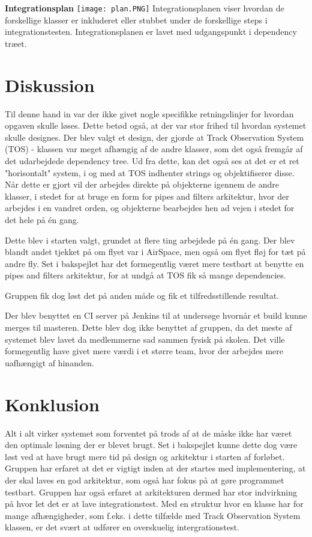 \textbf{Integrationsplan} \newline
\texttt{[image: plan.PNG]} \newline
Integrationsplanen viser hvordan de forskellige klasser er inkluderet eller stubbet under de forskellige steps i integrationstesten. Integrationsplanen er lavet med udgangspunkt i dependency træet.

\section{Diskussion}
Til denne hand in var der ikke givet nogle specifikke retningslinjer for hvordan opgaven skulle løses. Dette betød også, at der var stor frihed til hvordan systemet skulle designes. \tabularnewline
Der blev valgt et design, der gjorde at Track Observation System (TOS) - klassen var meget afhængig af de andre klasser, som det også fremgår af det udarbejdede dependency tree. 
Ud fra dette, kan det også ses at det er et ret "horisontalt" system, i og med at TOS indhenter strings og objektifiserer disse. 
Når dette er gjort vil der arbejdes direkte på objekterne igennem de andre klasser, i stedet for at bruge en form for pipes and filters arkitektur, hvor der arbejdes i en vandret orden, og objekterne bearbejdes hen ad vejen i stedet for det hele på én gang. 

Dette blev i starten valgt, grundet at flere ting arbejdede på én gang. Der blev blandt andet tjekket på om flyet var i AirSpace, men også om flyet fløj for tæt på andre fly. \tabularnewline
Set i bakspejlet har det formegentlig været mere testbart at benytte en pipes and filters arkitektur, for at undgå at TOS fik så mange dependencies.

Gruppen fik dog løst det på anden måde og fik et tilfredsstillende resultat.


Der blev benyttet en CI server på Jenkins til at undersøge hvornår et build kunne merges til masteren. \tabularnewline
Dette blev dog ikke benyttet af gruppen, da det meste af systemet blev lavet da medlemmerne sad sammen fysisk på skolen.\tabularnewline
Det ville formegentlig have givet mere værdi i et større team, hvor der arbejdes mere uafhængigt af hinanden. \newline
\pagebreak
\section{Konklusion}
Alt i alt virker systemet som forventet på trods af at de måske ikke har været den optimale løsning der er blevet brugt. \tabularnewline
Set i bakspejlet kunne dette dog være løst ved at have brugt mere tid på design og arkitektur i starten af forløbet.  \tabularnewline
Gruppen har erfaret at det er vigtigt inden at der startes med implementering, at der skal laves en god arkitektur,
som også har fokus på at gøre programmet testbart. \tabularnewline
Gruppen har også erfaret at arkitekturen dermed har stor indvirkning på hvor let det er at lave integrationstest. Med en struktur hvor 
en klasse har for mange afhængigheder, som f.eks. i dette tilfælde med Track Observation System klassen, er det svært at udfører en overskuelig
intergrationstest.
